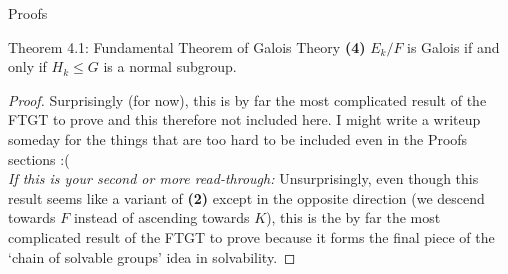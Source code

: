 \documentclass[12pt]{article}
\theoremstyle{definition}
\theoremstyle{definition}
\theoremstyle{definition}
\theoremstyle{definition}
\theoremstyle{definition}
\theoremstyle{definition}
\theoremstyle{definition}
\begin{document}
\begin{section}{Proofs}
\begin{subsection}{Theorem 4.1: Fundamental Theorem of Galois Theory}
        \noindent\textbf{(4)} \(E_k/F\) is Galois if and only if \(H_k\leq G\) is a normal subgroup.
        \begin{proof}
            Surprisingly (for now), this is by far the most complicated result of the FTGT to prove and this therefore not included here. 
            I might write a writeup someday for the things that are too hard to be included even in the Proofs sections :(\\
            \noindent\textit{If this is your second or more read-through:} Unsurprisingly, even though this result seems like a variant of \textbf{(2)} except 
            in the opposite direction (we descend towards \(F\) instead of ascending towards \(K\)), this is the by far the most complicated result of 
            the FTGT to prove because it forms the final piece of the `chain of solvable groups' idea in solvability.
        \end{proof}


\end{subsection}
\end{section}
\end{document}
